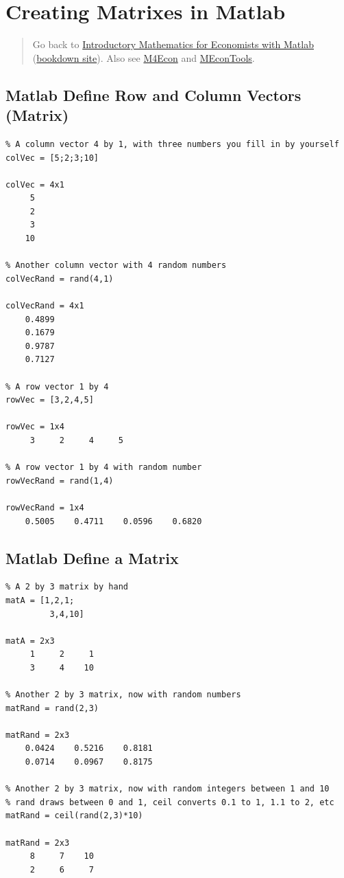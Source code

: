 \documentclass[
]{book}
\begin{document}
\vspace{1em}

\hypertarget{creating-matrixes-in-matlab}{%
\section{Creating Matrixes in Matlab}\label{creating-matrixes-in-matlab}}

\begin{quote}
Go back to \href{https://math4econ.github.io/}{Introductory Mathematics for Economists with Matlab} (\href{https://math4econ.github.io/bookdown}{bookdown site}). Also see \href{http://fanwangecon.github.io/M4Econ}{M4Econ} and \href{https://fanwangecon.github.io/MEconTools/}{MEconTools}.
\end{quote}

\hypertarget{matlab-define-row-and-column-vectors-matrix}{%
\subsection{Matlab Define Row and Column Vectors (Matrix)}\label{matlab-define-row-and-column-vectors-matrix}}

\begin{verbatim}
% A column vector 4 by 1, with three numbers you fill in by yourself
colVec = [5;2;3;10]

colVec = 4x1    
     5
     2
     3
    10

% Another column vector with 4 random numbers
colVecRand = rand(4,1)

colVecRand = 4x1    
    0.4899
    0.1679
    0.9787
    0.7127

% A row vector 1 by 4
rowVec = [3,2,4,5]

rowVec = 1x4    
     3     2     4     5

% A row vector 1 by 4 with random number
rowVecRand = rand(1,4)

rowVecRand = 1x4    
    0.5005    0.4711    0.0596    0.6820
\end{verbatim}

\hypertarget{matlab-define-a-matrix}{%
\subsection{Matlab Define a Matrix}\label{matlab-define-a-matrix}}

\begin{verbatim}
% A 2 by 3 matrix by hand
matA = [1,2,1;
         3,4,10]

matA = 2x3    
     1     2     1
     3     4    10

% Another 2 by 3 matrix, now with random numbers
matRand = rand(2,3)

matRand = 2x3    
    0.0424    0.5216    0.8181
    0.0714    0.0967    0.8175

% Another 2 by 3 matrix, now with random integers between 1 and 10
% rand draws between 0 and 1, ceil converts 0.1 to 1, 1.1 to 2, etc
matRand = ceil(rand(2,3)*10)

matRand = 2x3    
     8     7    10
     2     6     7
\end{verbatim}
\end{document}
